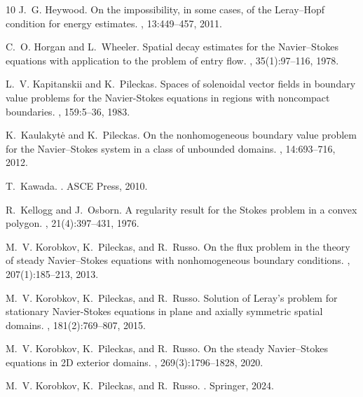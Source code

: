 \documentclass[11pt]{article}
\numberwithin{equation}{section}
\numberwithin{figure}{section}
\begin{document}
\begin{thebibliography}{10}
J.~G. Heywood.
\newblock On the impossibility, in some cases, of the {L}eray--{H}opf condition
  for energy estimates.
, 13:449--457, 2011.

C.~O. Horgan and L.~Wheeler.
\newblock Spatial decay estimates for the {N}avier--{S}tokes equations with
  application to the problem of entry flow.
, 35(1):97--116, 1978.

L.~V. Kapitanskii and K.~Pileckas.
\newblock Spaces of solenoidal vector fields in boundary value problems for the
  {N}avier-{S}tokes equations in regions with noncompact boundaries.
, 159:5--36, 1983.

K.~Kaulakyt{\.e} and K.~Pileckas.
\newblock On the nonhomogeneous boundary value problem for the
  {N}avier--{S}tokes system in a class of unbounded domains.
, 14:693--716, 2012.

T.~Kawada.
.
\newblock ASCE Press, 2010.

R.~Kellogg and J.~Osborn.
\newblock A regularity result for the {S}tokes problem in a convex polygon.
, 21(4):397--431, 1976.

M.~V. Korobkov, K.~Pileckas, and R.~Russo.
\newblock On the flux problem in the theory of steady {N}avier--{S}tokes
  equations with nonhomogeneous boundary conditions.
, 207(1):185--213,
  2013.

M.~V. Korobkov, K.~Pileckas, and R.~Russo.
\newblock Solution of {L}eray's problem for stationary {N}avier-{S}tokes
  equations in plane and axially symmetric spatial domains.
, 181(2):769--807, 2015.

M.~V. Korobkov, K.~Pileckas, and R.~Russo.
\newblock On the steady {N}avier--{S}tokes equations in 2{D} exterior domains.
, 269(3):1796--1828, 2020.

M.~V. Korobkov, K.~Pileckas, and R.~Russo.
.
\newblock Springer, 2024.


\end{thebibliography}
\end{document}
